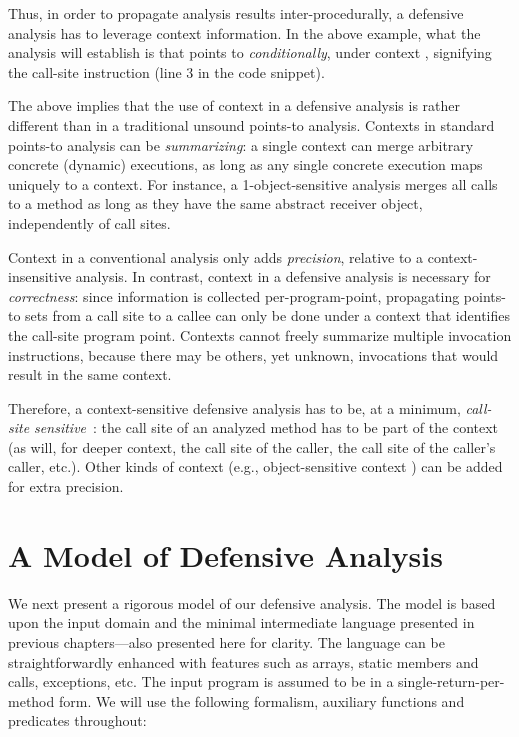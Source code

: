 Thus, in order to propagate analysis results inter-procedurally, a defensive analysis has to leverage context information. In the above example, what the analysis will establish is that  points to  \emph{conditionally}, under context , signifying the call-site instruction (line 3 in the code snippet). 

The above implies that the use of context in a defensive analysis is rather different than in a traditional unsound points-to analysis. Contexts in standard points-to analysis can be \emph{summarizing}: a single context can merge arbitrary concrete (dynamic) executions, as long as any single concrete execution maps uniquely to a context. For instance, a 1-object-sensitive analysis \cite{article:2005:Milanova} merges all calls to a method as long as they have the same abstract receiver object, independently of call sites.

Context in a conventional analysis only adds \emph{precision}, relative to a context-insensitive analysis. In contrast, context in a defensive analysis is necessary for \emph{correctness}: since information is collected per-program-point, propagating points-to sets from a call site to a callee can only be done under a context that identifies the call-site program point. Contexts cannot freely summarize multiple invocation instructions, because there may be others, yet unknown, invocations that would result in the same context.

Therefore, a context-sensitive defensive analysis has to be, at a minimum, \emph{call-site sensitive}~\cite{col:1981:Sharir,thesis:Shivers}: the call site of an analyzed method has to be part of the context (as will, for deeper context, the call site of the caller, the call site of the caller's caller, etc.). Other kinds of context (e.g., object-sensitive context \cite{article:2005:Milanova,popl:2011:Smaragdakis}) can be added for extra precision.


\section{A Model of Defensive Analysis}
\label{sec:sound:model}

We next present a rigorous model of our defensive analysis. The model is based upon the input domain and the minimal intermediate language presented in previous chapters---also presented here for clarity. The language can be straightforwardly enhanced with features such as arrays, static members and calls, exceptions, etc. The input program is assumed to be in a single-return-per-method form. We will use the following formalism, auxiliary functions and predicates throughout:

